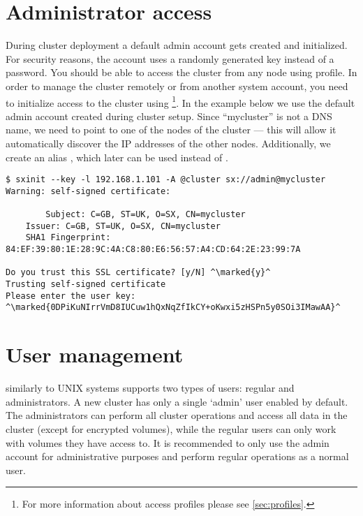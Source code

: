 \section{Administrator access}
During cluster deployment a default admin account gets created
and initialized. For security reasons, the account uses a randomly
generated key instead of a password. You should be able to access the
cluster from any node using  profile. In order
to manage the cluster remotely or from another system account,
you need to initialize access to the cluster using 
\footnote{For more information about access profiles please see
{\ifpdf{}\else\ref{sec:profiles}\fi}.}.
In the example below we use the default admin account created
during cluster setup. Since ``mycluster'' is not a DNS name, we need
to point  to one of the nodes of the cluster --- this will
allow it automatically discover the IP addresses of the other nodes.
Additionally, we create an alias , which later
can be used instead of .
\begin{lstlisting}
$ sxinit --key -l 192.168.1.101 -A @cluster sx://admin@mycluster
Warning: self-signed certificate:

        Subject: C=GB, ST=UK, O=SX, CN=mycluster
	Issuer: C=GB, ST=UK, O=SX, CN=mycluster
	SHA1 Fingerprint: 84:EF:39:80:1E:28:9C:4A:C8:80:E6:56:57:A4:CD:64:2E:23:99:7A

Do you trust this SSL certificate? [y/N] ^\marked{y}^
Trusting self-signed certificate
Please enter the user key: ^\marked{0DPiKuNIrrVmD8IUCuw1hQxNqZfIkCY+oKwxi5zHSPn5y0SOi3IMawAA}^
\end{lstlisting}

\section{User management}
\SX similarly to UNIX systems supports two types of users: regular and
administrators. A new cluster has only a single `admin' user enabled by
default. The administrators can perform all cluster operations and access
all data in the cluster (except for encrypted volumes), while the regular
users can only work with volumes they have access to. It is recommended to
only use the admin account for administrative purposes and perform regular
operations as a normal user.

